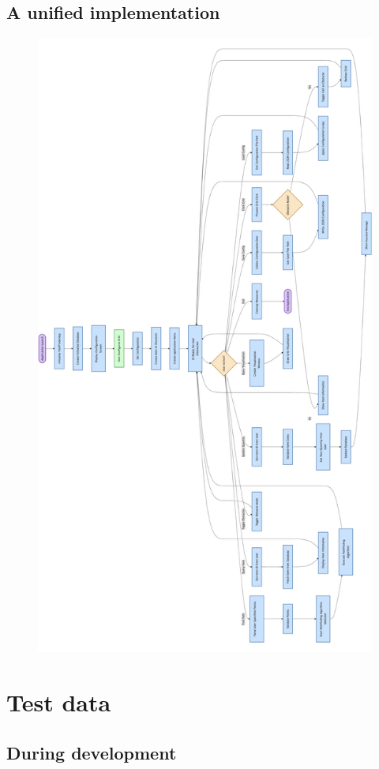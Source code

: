 \newpage

\subsection{A unified implementation}

\begin{figure}[htbp!]
    \centering
    \includegraphics[width=0.7\linewidth]{Flowcharts/Unified.png}

\end{figure}

\newpage

\section{Test data}

\subsection{During development}

